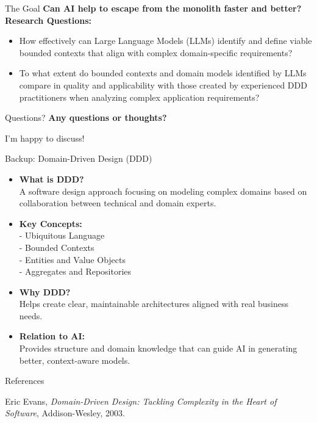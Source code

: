 \documentclass[aspectratio=169,12pt]{beamer}
\begin{document}
\begin{frame}{The Goal}
    \textbf{Can AI help to escape from the monolith faster and better?}
    \textbf{Research Questions:}
    \begin{itemize}
        \item How effectively can Large Language Models (LLMs) identify and define viable bounded contexts that align with complex domain-specific requirements?
        \item To what extent do bounded contexts and domain models identified by LLMs compare in quality and applicability with those created by experienced DDD practitioners when analyzing complex application requirements?
    \end{itemize}
\end{frame}

\begin{frame}{Questions?}
    \centering
    \vspace{2cm}
    \Huge
    \textbf{Any questions or thoughts?}
    
    \vspace{1cm}
    \large
    I’m happy to discuss!
\end{frame}

%
\begin{frame}{Backup: Domain-Driven Design (DDD)}
    \begin{itemize}
        \item \textbf{What is DDD?} \\
        A software design approach focusing on modeling complex domains based on collaboration between technical and domain experts.
        
        \item \textbf{Key Concepts:} \\
        - Ubiquitous Language \\
        - Bounded Contexts \\
        - Entities and Value Objects \\
        - Aggregates and Repositories
        
        \item \textbf{Why DDD?} \\
        Helps create clear, maintainable architectures aligned with real business needs.
        
        \item \textbf{Relation to AI:} \\
        Provides structure and domain knowledge that can guide AI in generating better, context-aware models.
    \end{itemize}
\end{frame}

\begin{frame}[allowframebreaks]{References}
    \footnotesize
    \begin{thebibliography}{10}

    Eric Evans,
    \newblock \textit{Domain-Driven Design: Tackling Complexity in the Heart of Software},
    \newblock Addison-Wesley, 2003.
    \end{thebibliography}
\end{frame}
\end{document}
